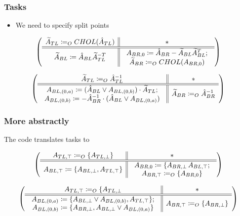\documentclass{beamer}
\begin{document}
\begin{frame}
  \frametitle{Tasks}
  \begin{itemize}
  \item We need to specify split points
  \end{itemize}

  \begin{equation*}
    \left( \begin{array}{c || c} \widetilde{A}_{TL} \coloneqq_O CHOL(\hat{A}_{TL}) & * \\ \hline \hline \widetilde{A}_{BL} \coloneqq \hat{A}_{BL}\widetilde{A}_{TL}^{-T} & \begin{array}{c}
       A_{BR, 0} \coloneqq \hat{A}_{BR} - \widetilde{A}_{BL}\widetilde{A}_{BL}^T;\\
       \widetilde{A}_{BR} \coloneqq_O CHOL(A_{BR, 0})
     \end{array} \end{array} \right)
  \end{equation*}

  \begin{equation*}
    \left( \begin{array}{c || c} \widetilde{A}_{TL} \coloneqq_O \hat{A}_{TL}^{-1} & * \\ \hline \hline \begin{array}{c}
       A_{BL, (0, a)} \coloneqq (\hat{A}_{BL} \vee A_{BL, (0, b)}) \cdot \widetilde{A}_{TL};\\
       A_{BL, (0, b)} \coloneqq -\hat{A}_{BR}^{-1} \cdot (\hat{A}_{BL} \vee A_{BL, (0, a)})
     \end{array} & \widetilde{A}_{BR} \coloneqq_O \hat{A}_{BR}^{-1} \end{array} \right)
  \end{equation*}
\end{frame}

\begin{frame}
  \frametitle{More abstractly}
  The code translates tasks to

    \begin{equation*}
    \left( \begin{array}{c || c} A_{TL, \top} \coloneqq_O \{A_{TL, \bot}\} & * \\ \hline \hline A_{BL, \top} \coloneqq \{A_{BL, \bot}, A_{TL, \top}\} & \begin{array}{c}
       A_{BR, 0} \coloneqq \{A_{BR, \bot}\, A_{BL, \top};\\
       A_{BR, \top} \coloneqq_O \{A_{BR, 0}\}
     \end{array} \end{array} \right)
  \end{equation*}

  \begin{equation*}
    \left( \begin{array}{c || c} A_{TL, \top} \coloneqq_O \{A_{TL, \bot} & * \\ \hline \hline \begin{array}{c}
       A_{BL, (0, a)} \coloneqq \{A_{BL, \bot} \vee A_{BL, (0, b)}, A_{TL, \top}\};\\
       A_{BL, (0, b)} \coloneqq \{A_{BR, \bot}, A_{BL, \bot} \vee A_{BL, (0, a)}\}
     \end{array} & A_{BR, \top} \coloneqq_O \{A_{BR, \bot}\} \end{array} \right)
  \end{equation*}
\end{frame}
\end{document}
